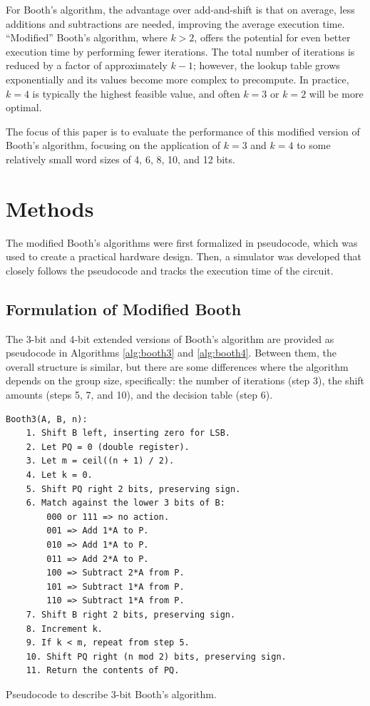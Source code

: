 \documentclass[12pt]{article}
\begin{document}
For Booth's algorithm, the advantage over add-and-shift is that on average,
less additions and subtractions are needed, improving the average execution
time. ``Modified'' Booth's algorithm, where $k > 2$, offers the potential for
even better execution time by performing fewer iterations. The total number of
iterations is reduced by a factor of approximately $k-1$; however, the lookup
table grows exponentially and its values become more complex to precompute. In
practice, $k=4$ is typically the highest feasible value, and often $k=3$ or
$k=2$ will be more optimal.

The focus of this paper is to evaluate the performance of this modified version
of Booth's algorithm, focusing on the application of $k=3$ and $k=4$ to some
relatively small word sizes of 4, 6, 8, 10, and 12 bits.

\section{Methods}

The modified Booth's algorithms were first formalized in pseudocode, which was
used to create a practical hardware design. Then, a simulator was developed
that closely follows the pseudocode and tracks the execution time of the
circuit.

\subsection{Formulation of Modified Booth}

The 3-bit and 4-bit extended versions of Booth's algorithm are provided as
pseudocode in Algorithms \ref{alg:booth3} and \ref{alg:booth4}. Between them,
the overall structure is similar, but there are some differences where the
algorithm depends on the group size, specifically: the number of iterations
(step 3), the shift amounts (steps 5, 7, and 10), and the decision table (step
6).

\begin{algorithm}[H]
    \begin{lstlisting}
Booth3(A, B, n):
    1. Shift B left, inserting zero for LSB.
    2. Let PQ = 0 (double register).
    3. Let m = ceil((n + 1) / 2).
    4. Let k = 0.
    5. Shift PQ right 2 bits, preserving sign.
    6. Match against the lower 3 bits of B:
        000 or 111 => no action.
        001 => Add 1*A to P.
        010 => Add 1*A to P.
        011 => Add 2*A to P.
        100 => Subtract 2*A from P.
        101 => Subtract 1*A from P.
        110 => Subtract 1*A from P.
    7. Shift B right 2 bits, preserving sign.
    8. Increment k.
    9. If k < m, repeat from step 5.
    10. Shift PQ right (n mod 2) bits, preserving sign.
    11. Return the contents of PQ.
    \end{lstlisting}
    \caption{Pseudocode to describe 3-bit Booth's algorithm.}
    \label{alg:booth3}
\end{algorithm}
\newpage
\end{document}
